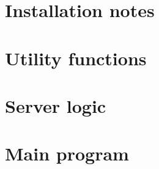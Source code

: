 \documentclass{book}
\begin{document}
\section{Installation notes}


\section{Utility functions}



\section{Server logic}


\section{Main program}

\end{document}
